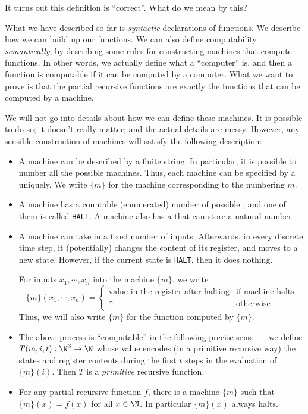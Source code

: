 \documentclass[a4paper]{article}
\begin{document}
It turns out this definition is ``correct''. What do we mean by this?

What we have described so far is \emph{syntactic} declarations of functions. We describe how we can build up our functions. We can also define computability \emph{semantically}, by describing some rules for constructing machines that compute functions. In other words, we actually define what a ``computer'' is, and then a function is computable if it can be computed by a computer. What we want to prove is that the partial recursive functions are exactly the functions that can be computed by a machine.

We will not go into details about how we can define these machines. It is possible to do so; it doesn't really matter; and the actual details are messy. However, any sensible construction of machines will satisfy the following description:
\begin{itemize}
  \item A machine can be described by a finite string. In particular, it is possible to number all the possible machines. Thus, each machine can be specified by a  uniquely. We write $\{m\}$ for the machine corresponding to the numbering $m$.
  \item A machine has a countable (enumerated) number of possible , and one of them is called \texttt{HALT}. A machine also has a  that can store a natural number.
  \item A machine can take in a fixed number of inputs. Afterwards, in every discrete time step, it (potentially) changes the content of its register, and moves to a new state. However, if the current state is \texttt{HALT}, then it does nothing.

    For inputs $x_1, \cdots, x_n$ into the machine $\{m\}$, we write
    \[
      \{m\}(x_1, \cdots, x_n) =
      \begin{cases}
        \text{value in the register after halting} & \text{if machine halts}\\
        \uparrow & \text{otherwise}
      \end{cases}
    \]
    Thus, we will also write $\{m\}$ for the function computed by $\{m\}$.
  \item The above process is ``computable'' in the following precise sense --- we define  $T(m, i, t): \N^3 \to \N$ whose value encodes (in a primitive recursive way) the states and register contents during the first $t$ steps in the evaluation of $\{m\}(i)$. Then $T$ is a \emph{primitive} recursive function.
  \item For any partial recursive function $f$, there is a machine $\{m\}$ such that $\{m\}(x) = f(x)$ for all $x \in \N$. In particular $\{m\}(x)$ always halts.
\end{itemize}
\end{document}
